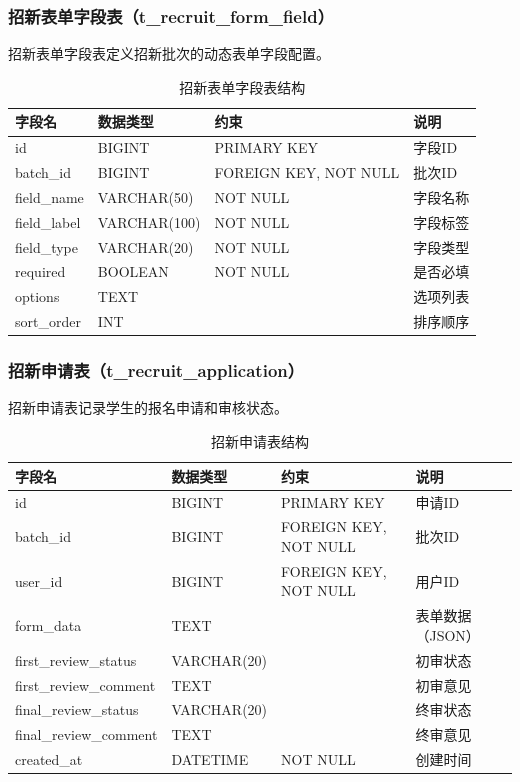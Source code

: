 \subsubsection{招新表单字段表（t\_recruit\_form\_field）}

招新表单字段表定义招新批次的动态表单字段配置。

\begin{table}[H]
\centering
\caption{招新表单字段表结构}
\begin{tabular}{llll}
\toprule
字段名 & 数据类型 & 约束 & 说明 \\
\midrule
id & BIGINT & PRIMARY KEY & 字段ID \\
batch\_id & BIGINT & FOREIGN KEY, NOT NULL & 批次ID \\
field\_name & VARCHAR(50) & NOT NULL & 字段名称 \\
field\_label & VARCHAR(100) & NOT NULL & 字段标签 \\
field\_type & VARCHAR(20) & NOT NULL & 字段类型 \\
required & BOOLEAN & NOT NULL & 是否必填 \\
options & TEXT & & 选项列表 \\
sort\_order & INT & & 排序顺序 \\
\bottomrule
\end{tabular}
\end{table}

\subsubsection{招新申请表（t\_recruit\_application）}

招新申请表记录学生的报名申请和审核状态。

\begin{table}[H]
\centering
\caption{招新申请表结构}
\begingroup
\setlength{\tabcolsep}{4pt}
\small
\begin{tabular}{>{\raggedright\arraybackslash}p{} >{\raggedright\arraybackslash}p{} >{\raggedright\arraybackslash}p{} >{\raggedright\arraybackslash}p{}}
\toprule
字段名 & 数据类型 & 约束 & 说明 \\
\midrule
id & BIGINT & PRIMARY KEY & 申请ID \\
batch\_\allowbreak{}id & BIGINT & FOREIGN KEY, NOT NULL & 批次ID \\
user\_\allowbreak{}id & BIGINT & FOREIGN KEY, NOT NULL & 用户ID \\
form\_\allowbreak{}data & TEXT & & 表单数据（JSON） \\
first\_\allowbreak{}review\_\allowbreak{}status & VARCHAR\allowbreak(20) & & 初审状态 \\
first\_\allowbreak{}review\_\allowbreak{}comment & TEXT & & 初审意见 \\
final\_\allowbreak{}review\_\allowbreak{}status & VARCHAR\allowbreak(20) & & 终审状态 \\
final\_\allowbreak{}review\_\allowbreak{}comment & TEXT & & 终审意见 \\
created\_\allowbreak{}at & DATETIME & NOT NULL & 创建时间 \\
\bottomrule
\end{tabular}
\endgroup
\end{table}

